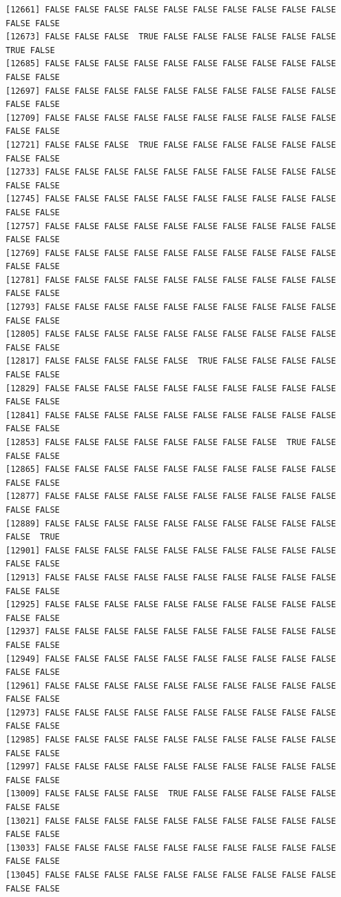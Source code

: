 \documentclass[
  a4paper,
  DIV=11,
  numbers=noendperiod]{scrartcl}
\begin{document}
\begin{verbatim}
[12661] FALSE FALSE FALSE FALSE FALSE FALSE FALSE FALSE FALSE FALSE FALSE FALSE
[12673] FALSE FALSE FALSE  TRUE FALSE FALSE FALSE FALSE FALSE FALSE  TRUE FALSE
[12685] FALSE FALSE FALSE FALSE FALSE FALSE FALSE FALSE FALSE FALSE FALSE FALSE
[12697] FALSE FALSE FALSE FALSE FALSE FALSE FALSE FALSE FALSE FALSE FALSE FALSE
[12709] FALSE FALSE FALSE FALSE FALSE FALSE FALSE FALSE FALSE FALSE FALSE FALSE
[12721] FALSE FALSE FALSE  TRUE FALSE FALSE FALSE FALSE FALSE FALSE FALSE FALSE
[12733] FALSE FALSE FALSE FALSE FALSE FALSE FALSE FALSE FALSE FALSE FALSE FALSE
[12745] FALSE FALSE FALSE FALSE FALSE FALSE FALSE FALSE FALSE FALSE FALSE FALSE
[12757] FALSE FALSE FALSE FALSE FALSE FALSE FALSE FALSE FALSE FALSE FALSE FALSE
[12769] FALSE FALSE FALSE FALSE FALSE FALSE FALSE FALSE FALSE FALSE FALSE FALSE
[12781] FALSE FALSE FALSE FALSE FALSE FALSE FALSE FALSE FALSE FALSE FALSE FALSE
[12793] FALSE FALSE FALSE FALSE FALSE FALSE FALSE FALSE FALSE FALSE FALSE FALSE
[12805] FALSE FALSE FALSE FALSE FALSE FALSE FALSE FALSE FALSE FALSE FALSE FALSE
[12817] FALSE FALSE FALSE FALSE FALSE  TRUE FALSE FALSE FALSE FALSE FALSE FALSE
[12829] FALSE FALSE FALSE FALSE FALSE FALSE FALSE FALSE FALSE FALSE FALSE FALSE
[12841] FALSE FALSE FALSE FALSE FALSE FALSE FALSE FALSE FALSE FALSE FALSE FALSE
[12853] FALSE FALSE FALSE FALSE FALSE FALSE FALSE FALSE  TRUE FALSE FALSE FALSE
[12865] FALSE FALSE FALSE FALSE FALSE FALSE FALSE FALSE FALSE FALSE FALSE FALSE
[12877] FALSE FALSE FALSE FALSE FALSE FALSE FALSE FALSE FALSE FALSE FALSE FALSE
[12889] FALSE FALSE FALSE FALSE FALSE FALSE FALSE FALSE FALSE FALSE FALSE  TRUE
[12901] FALSE FALSE FALSE FALSE FALSE FALSE FALSE FALSE FALSE FALSE FALSE FALSE
[12913] FALSE FALSE FALSE FALSE FALSE FALSE FALSE FALSE FALSE FALSE FALSE FALSE
[12925] FALSE FALSE FALSE FALSE FALSE FALSE FALSE FALSE FALSE FALSE FALSE FALSE
[12937] FALSE FALSE FALSE FALSE FALSE FALSE FALSE FALSE FALSE FALSE FALSE FALSE
[12949] FALSE FALSE FALSE FALSE FALSE FALSE FALSE FALSE FALSE FALSE FALSE FALSE
[12961] FALSE FALSE FALSE FALSE FALSE FALSE FALSE FALSE FALSE FALSE FALSE FALSE
[12973] FALSE FALSE FALSE FALSE FALSE FALSE FALSE FALSE FALSE FALSE FALSE FALSE
[12985] FALSE FALSE FALSE FALSE FALSE FALSE FALSE FALSE FALSE FALSE FALSE FALSE
[12997] FALSE FALSE FALSE FALSE FALSE FALSE FALSE FALSE FALSE FALSE FALSE FALSE
[13009] FALSE FALSE FALSE FALSE  TRUE FALSE FALSE FALSE FALSE FALSE FALSE FALSE
[13021] FALSE FALSE FALSE FALSE FALSE FALSE FALSE FALSE FALSE FALSE FALSE FALSE
[13033] FALSE FALSE FALSE FALSE FALSE FALSE FALSE FALSE FALSE FALSE FALSE FALSE
[13045] FALSE FALSE FALSE FALSE FALSE FALSE FALSE FALSE FALSE FALSE FALSE FALSE

\end{verbatim}
\end{document}
